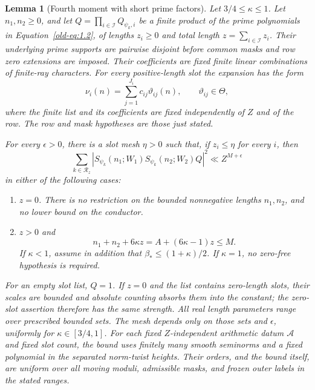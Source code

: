 \documentclass[11pt,a4paper]{article}
\numberwithin{equation}{section}
\numberwithin{figure}{section}
\newtheorem{lemma}[theorem]{Lemma}
\theoremstyle{definition}
\theoremstyle{remark}
\begin{document}
\begin{lemma}[Fourth moment with short prime factors]\label{lem:plain}
Let \(3/4\le\kappa\le1\).  Let \(n_1,n_2\ge0\), and let
\(Q=\prod_{i\in\mathcal I}Q_{\psi_k,i}\) be a finite product of the
prime polynomials in Equation~\eqref{old-eq:1.2}, of lengths
\(z_i\ge0\) and total length \(z=\sum_{i\in\mathcal I}z_i\).
Their underlying prime supports are pairwise disjoint before common
masks and row zero extensions are imposed.  Their coefficients are
fixed finite linear combinations of finite-ray characters.  For every
positive-length slot the expansion has the form
\[
 \nu_i(n)=\sum_{j=1}^{J_i}c_{ij}\vartheta_{ij}(n),
 \qquad \vartheta_{ij}\in\Theta,
\]
where the finite list and its coefficients are fixed independently of
\(Z\) and of the row.  The row and mask hypotheses are those just stated.

For every \(\epsilon>0\), there is a slot mesh \(\eta>0\) such that,
if \(z_i\le\eta\) for every \(i\), then
\begin{equation}
 \sum_{k\in\mathcal R_z}
 \left|S_{\psi_k}(n_1;W_1)S_{\psi_k}(n_2;W_2)Q\right|^2
 \ll Z^{M+\epsilon}
 \label{old-eq:2.1}
\end{equation}
in either of the following cases:
\begin{enumerate}
\item \(z=0\).  There is no restriction on the bounded nonnegative
      lengths \(n_1,n_2\), and no lower bound on the conductor.
\item \(z>0\) and
\begin{equation}
 n_1+n_2+6\kappa z=A+(6\kappa-1)z\le M.
 \label{old-eq:3.9}
\end{equation}
      If \(\kappa<1\), assume in addition that
      \(\beta_*\le(1+\kappa)/2\).  If \(\kappa=1\), no zero-free
      hypothesis is required.
\end{enumerate}
For an empty slot list, \(Q=1\).  If \(z=0\) and the list contains
zero-length slots, their scales are bounded and absolute counting
absorbs them into the constant; the zero-slot assertion therefore
has the same strength.  All real length parameters range over prescribed bounded
sets.  The mesh depends only on those sets and \(\epsilon\), uniformly
for \(\kappa\in[3/4,1]\).  For each fixed \(Z\)-independent arithmetic
datum \(\mathcal A\) and fixed slot count, the bound uses finitely many
smooth seminorms and a fixed polynomial in the separated norm-twist
heights.  Their orders, and the bound itself, are uniform over all
moving moduli, admissible masks, and frozen outer labels in the stated
ranges.
\end{lemma}
\end{document}
